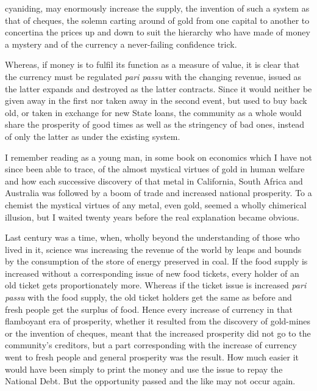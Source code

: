 \documentclass[10.5pt,twoside]{book}
\newcommand{\origpage}[1]{\clearpage\setcounter{page}{#1}}
\begin{document}
\origpage{17}

\noindent cyaniding, may enormously increase the supply, the invention of such
a system as that of cheques, the solemn carting around of gold from one
capital to another to concertina the prices up and down to suit the hierarchy
who have made of money a mystery and of the currency a never-failing
confidence trick.

Whereas, if money is to fulfil its function as a measure of value, it is clear
that the currency must be regulated \textit{pari passu} with the changing
revenue, issued as the latter expands and destroyed as the latter contracts.
Since it would neither be given away in the first nor taken away in the second
event, but used to buy back old, or taken in exchange for new State loans, the
community as a whole would share the prosperity of good times as well as the
stringency of bad ones, instead of only the latter as under the existing
system.

I remember reading as a young man, in some book on economics which I have not
since been able to trace, of the almost mystical virtues of gold in human
welfare and how each successive discovery of that metal in California, South
Africa and Australia was followed by a boom of trade and increased national
prosperity. To a chemist the mystical virtues of any metal, even gold, seemed
a wholly chimerical illusion, but I waited twenty years before the real
explanation became obvious.

Last century was a time, when, wholly beyond the understanding of those who
lived in it, science was increasing the revenue of the world by leaps and
bounds by the consumption of the store of energy preserved in coal. If the
food supply is increased without a corresponding issue of new food tickets,
every holder of an old ticket gets proportionately more. Whereas if the ticket
issue is increased \textit{pari passu} with the food supply, the old ticket
holders get the same as before and fresh people get the surplus of food. Hence
every increase of currency in that flamboyant era of prosperity, whether it
resulted from the discovery of gold-mines or the invention of cheques, meant
that the increased prosperity did not go to the community's creditors, but a
part corresponding with the increase of currency went to fresh people and
general prosperity was the result. How much easier it would have been simply
to print the money and use the issue to repay the National Debt. But the
opportunity passed and the like may not occur again.
\end{document}
